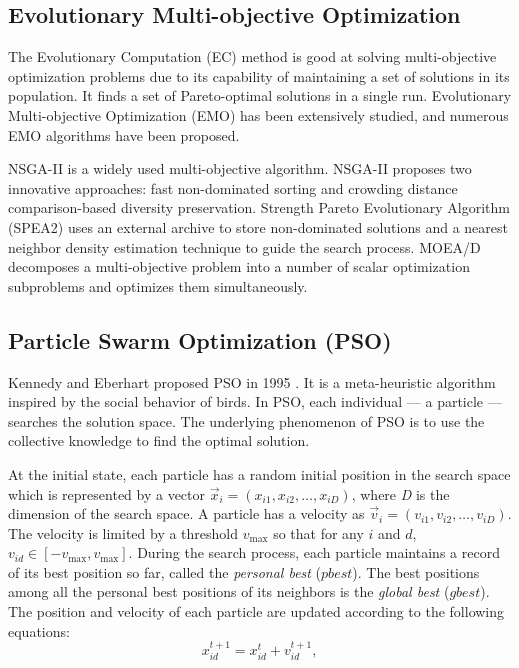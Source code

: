 \documentclass[10pt,journal,compsoc]{IEEEtran}
\begin{document}
\subsection{Evolutionary Multi-objective Optimization}
The Evolutionary Computation (EC) method is good at solving multi-objective optimization problems due to its capability of maintaining a set of solutions in its population. It finds a set of Pareto-optimal solutions in a single run. Evolutionary Multi-objective Optimization (EMO) has been extensively studied, and numerous EMO algorithms have been proposed.

NSGA-II \cite{nsgaii} is a widely used multi-objective algorithm. NSGA-II proposes two innovative approaches: fast non-dominated sorting and crowding distance comparison-based diversity preservation. 
Strength Pareto Evolutionary Algorithm (SPEA2)\cite{kim2004spea2} uses an external archive to store non-dominated solutions and a nearest neighbor density estimation technique to guide the search process. MOEA/D \cite{zhang2007moea} decomposes a multi-objective problem into a number of scalar optimization subproblems and optimizes them simultaneously.

\vspace{-3 mm}

\subsection{Particle Swarm Optimization (PSO)}
Kennedy and Eberhart proposed PSO in 1995 \cite{kennedy2011particle}. It is a meta-heuristic algorithm inspired by the social behavior of birds. In PSO, each individual --- a particle --- searches the solution space. The underlying phenomenon of PSO is to use the collective knowledge to find the optimal solution.

At the initial state, each particle has a random initial position in the search space which is represented by a vector $\vec{x}_i = (x_{i1}, x_{i2}, \dots, x_{iD})$, where \emph{D} is the dimension of the search space. A particle has a velocity as $\vec{v}_i = (v_{i1}, v_{i2}, \dots, v_{iD})$. The velocity is limited by a threshold $v_{\max}$ so that for any $i$ and $d$, $v_{id} \in [-v_{\max}, v_{\max}]$. During the search process, each particle maintains a record of its best position so far, called the \emph{personal best} ($pbest$). The best positions among all the personal best positions of its neighbors is the \emph{global best} ($gbest$). The position and velocity of each particle are updated according to the following equations:
\vspace{-3 mm}
\begin{equation}
\label{eq:updatePosition}
 x^{t+1}_{id} = x^{t}_{id} + v^{t+1}_{id},
\end{equation}
\end{document}
